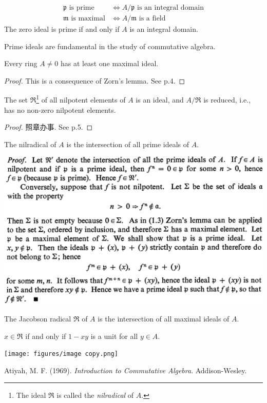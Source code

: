 \begin{align*}
    \mathfrak{p} \text{ is prime} & \iff A/\mathfrak{p} \text{ is an integral domain}\\
    \mathfrak{m} \text{ is maximal} & \iff A/\mathfrak{m} \text{ is a field}
\end{align*}
The zero ideal is prime if and only if $A$ is an integral domain.
\begin{note}
    Prime ideals are fundamental in the study of commutative algebra.
\end{note}
\begin{theorem}
    Every ring $A\ne 0$ has at least one maximal ideal.
\end{theorem}
\begin{proof}
    This is a consequence of Zorn's lemma. See \cite{Atiyah} p.4.
\end{proof}
\begin{proposition}
    The set $\mathfrak{R}$\footnote{The ideal $\mathfrak{R}$ is called the \textit{nilradical} of $A$.} of all nilpotent elements of $A$ is an ideal, and $A/\mathfrak{R}$ is reduced, i.e., has no non-zero nilpotent elements.
\end{proposition}
\begin{proof}
    照章办事. See \cite{Atiyah} p.5.
\end{proof}
\begin{proposition}
    The nilradical of $A$ is the intersection of all prime ideals of $A$.
\end{proposition}
\includegraphics[width=\textwidth]{figures/image.png}

The Jacobson radical $\mathfrak{R}$ of $A$ is the intersection of all maximal ideals of $A$.

\begin{proposition}
    $x\in \mathfrak{R}$ if and only if $1-xy$ is a unit for all $y\in A$.
\end{proposition}
\texttt{[image: figures/image copy.png]}









\begin{thebibliography}{99}
    Atiyah, M. F. (1969). \textit{Introduction to Commutative Algebra}. Addison-Wesley.
\end{thebibliography}
